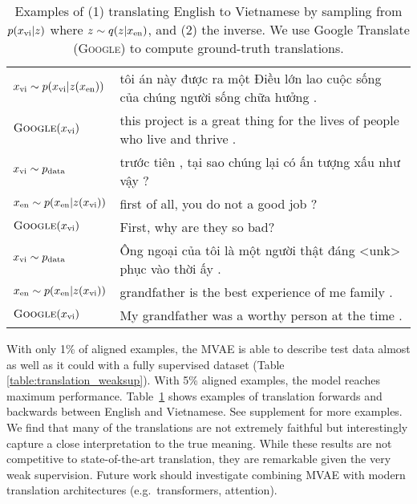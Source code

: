 \begin{table}[h]
\begin{tabular}{ l|l }
  $x_{\textup{vi}} \sim p(x_{\textup{vi}}|z(x_{\textup{en}}))$ & \foreignlanguage{vietnamese}{tôi án này được ra một Điều lớn lao cuộc sống của chúng người sống chữa hưởng .} \\
  $\textsc{Google}(x_{\textup{vi}})$ & this project is a great thing for the lives of people who live and thrive . \\
  \bottomrule
  $x_{\textup{vi}} \sim p_{\textup{data}}$ & \foreignlanguage{vietnamese}{trước tiên , tại sao chúng lại có ấn tượng xấu như vậy ?} \\
  $x_{\textup{en}} \sim p(x_{\textup{en}}|z(x_{\textup{vi}}))$ & first of all, you do not a good job ? \\
  $\textsc{Google}(x_{\textup{vi}})$ & First, why are they so bad? \\
  \hline
  $x_{\textup{vi}} \sim p_{\textup{data}}$ & \foreignlanguage{vietnamese}{Ông ngoại của tôi là một người thật đáng <unk> phục vào thời ấy .} \\
  $x_{\textup{en}} \sim p(x_{\textup{en}}|z(x_{\textup{vi}}))$ & grandfather is the best experience of me family . \\
  $\textsc{Google}(x_{\textup{vi}})$ & My grandfather was a worthy person at the time . \\
  \bottomrule
\end{tabular}
\caption{Examples of (1) translating English to Vietnamese by sampling from $p(x_{\textup{vi}}|z)$ where $z \sim q(z|x_{\textup{en}})$, and (2) the inverse. We use Google Translate (\textsc{Google}) to compute ground-truth translations.}
\label{table:translation_examples}
\end{table}

With only 1\% of aligned examples, the MVAE is able to describe test data almost as well as it could with a fully supervised dataset (Table \ref{table:translation_weaksup}). With 5\% aligned examples, the model reaches maximum performance. Table~\ref{table:translation_examples} shows examples of translation forwards and backwards between English and Vietnamese. See supplement for more examples. We find that many of the translations are not extremely faithful but interestingly capture a close interpretation to the true  meaning. While these results are not competitive to state-of-the-art translation, they are remarkable given the very weak supervision. Future work should investigate combining MVAE with modern translation architectures (e.g.~transformers, attention).

